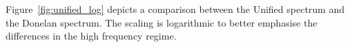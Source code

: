 %
Figure~\ref{fig:unified_log} depicts a comparison between the Unified spectrum
and the Donelan spectrum. The scaling is logarithmic to better emphasise the
differences in the high frequency regime.
%
\begin{figure}
 \centering
 \hfill
 \subtop[$U_{10}=\sqrt{8}$]
 {
}
\end{figure}

